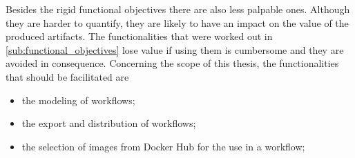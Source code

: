   Besides the rigid functional objectives there are also less palpable ones. Although they are harder to quantify, they are likely to have an impact on the value of the produced artifacts. The functionalities that were worked out in \ref{sub:functional_objectives} lose value if using them is cumbersome and they are avoided in consequence. Concerning the scope of this thesis, the functionalities that should be facilitated are
  \begin{itemize}[nosep]
    \item the modeling of workflows;
    \item the export and distribution of workflows;
    \item the selection of images from Docker Hub for the use in a workflow;
  \end{itemize}
